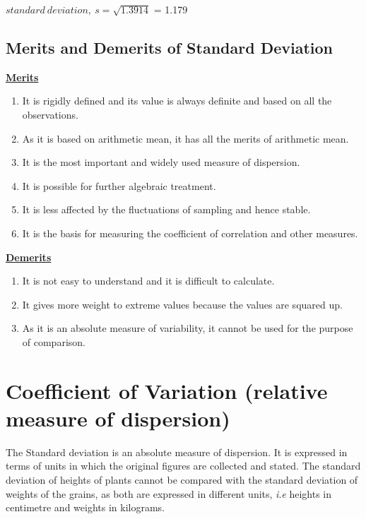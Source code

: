 \documentclass[
]{book}
\begin{document}
\(standard\ deviation,\ s = \sqrt{1.3914}\) = 1.179

\subsection{Merits and Demerits of Standard Deviation}\label{merits-and-demerits-of-standard-deviation}

\ul{\textbf{Merits}}

\begin{enumerate}
\def\labelenumi{\arabic{enumi}.}
\item
  It is rigidly defined and its value is always definite and based on
  all the observations.
\item
  As it is based on arithmetic mean, it has all the merits of
  arithmetic mean.
\item
  It is the most important and widely used measure of dispersion.
\item
  It is possible for further algebraic treatment.
\item
  It is less affected by the fluctuations of sampling and hence
  stable.
\item
  It is the basis for measuring the coefficient of correlation and
  other measures.
\end{enumerate}

\ul{\textbf{Demerits}}

\begin{enumerate}
\def\labelenumi{\arabic{enumi}.}
\item
  It is not easy to understand and it is difficult to calculate.
\item
  It gives more weight to extreme values because the values are
  squared up.
\item
  As it is an absolute measure of variability, it cannot be used for
  the purpose of comparison.
\end{enumerate}

\section{Coefficient of Variation (relative measure of dispersion)}\label{coefficient-of-variation-relative-measure-of-dispersion}

The Standard deviation is an absolute measure of dispersion. It is
expressed in terms of units in which the original figures are collected
and stated. The standard deviation of heights of plants cannot be
compared with the standard deviation of weights of the grains, as both
are expressed in different units, \emph{i}.\emph{e} heights in centimetre and
weights in kilograms.
\end{document}
